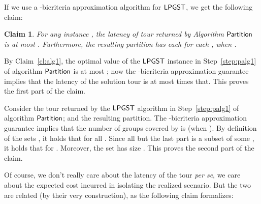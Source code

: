 \documentclass[11pt]{article}
\newtheorem{claim}[thm]{Claim}
\def\palg{\ensuremath{{\sf Partition}}\xspace}
\def\lpgst{\ensuremath{{\sf LPGST}}\xspace}
\newenvironment{pf}{

\noindent{\bf Proof:}} {\hfill


}
\begin{document}
\medskip\noindent If we use a -bicriteria approximation algorithm for \lpgst,
we get the following claim:
\begin{claim}
  \label{cl:alg4}
  For any instance , the
 latency of tour  returned by Algorithm \palg is at most
  .
Furthermore, the resulting partition  has each  for each , when .
\end{claim}
\begin{pf} By Claim~\ref{cl:alg1}, the optimal value of the \lpgst instance in Step~\ref{step:palg1} of algorithm \palg is at
most ; now the -bicriteria approximation guarantee 
 implies that the latency of the solution tour  is at most  times that. This proves the first part
of the claim.

Consider  the tour returned by the \lpgst algorithm in
Step~\ref{step:palg1} of algorithm \palg; and  the resulting partition. 
The -bicriteria approximation guarantee implies  that the number of groups covered by  is   (when ). By definition of the sets , it holds that  for
all . Since all but the last part  is a  subset of some , it holds that  for
.  Moreover, the set  has size . This proves the second part of the claim.
\end{pf}


Of course, we don't really care about the latency of the tour \emph{per se}, we care about the expected cost incurred in
isolating the realized scenario. But the two are related (by their very construction), as the following claim
formalizes:
\end{document}
